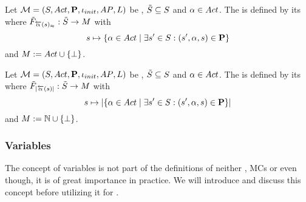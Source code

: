 \documentclass[preview]{standalone}
\begin{document}
\begin{definition}
	Let ${{{\mathcal{M}}}} = {{({S}, {Act}, {\textbf{P}}, {\iota_{init}}, {AP}, {L})}}$ be \achgphN, ${\tilde{{S}}} \subseteq {S}$ and ${\alpha} \in {Act}$. The \viewN \viewweakinactident is defined by its \grpfctN where ${{\tilde{F}_{{{\overleftarrow{{\alpha}}}({s})_\approx}}}} : {\tilde{{S}}} \to {\ensuremath{{M}}}$ with
	\[
	{s} \mapsto \{{\alpha} \in {Act} \mid \exists {s}' \in {S} : ({s}', {\alpha}, {s}) \in {\ensuremath{{\textbf{P}}}}\} 	
	\]
	and ${{M}} := {Act}\cup {\{\bot\}}$.
\end{definition}

\begin{definition}
	Let ${{{\mathcal{M}}}} = {{({S}, {Act}, {\textbf{P}}, {\iota_{init}}, {AP}, {L})}}$ be \achgphN, ${\tilde{{S}}} \subseteq {S}$ and ${\alpha} \in {Act}$. The \viewN \viewinactsetsize is defined by its \grpfctN where ${{\tilde{F}_{{|{\overleftarrow{{\alpha}}}({s})|}}}} : {\tilde{{S}}} \to {\ensuremath{{M}}}$ with
	\[
	{s} \mapsto |\{{\alpha} \in {Act} \mid \exists {s}' \in {S} : ({s}', {\alpha}, {s}) \in {\ensuremath{{\textbf{P}}}}\}|
	\]
	and ${{M}} := {\mathbb{N}} \cup {\{\bot\}}$.
\end{definition}

\subsubsection{Variables}
The concept of variables is not part of the definitions of neither \tsN, MCs or \mdpsN even though, it is of great importance in practice. We will introduce and discuss this concept before utilizing it for \viewsN.
\end{document}
